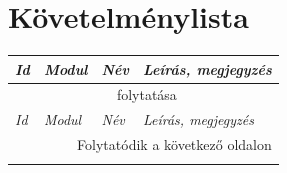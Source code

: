 \documentclass[]{thesis-ekf}
\theoremstyle{definition}
\theoremstyle{remark}
\begin{document}
		\section*{Követelménylista}\label{kovetelmenylista}
			\begin{longtable}{|l|l|p{3cm}|p{8cm}|}
				\hline
				\emph{Id} & \emph{Modul} & \emph{Név} & \emph{Leírás, megjegyzés} \\ \hline
				\endfirsthead
				
				\multicolumn{4}{c}{{\tablename\ folytatása}} \\
				\hline
				\emph{Id} & \emph{Modul} & \emph{Név} & \emph{Leírás, megjegyzés} \\ \hline
				\endhead
				
				\hline \multicolumn{4}{r}{{Folytatódik a következő oldalon}} \\
				\endfoot
				
				\hline
				\endlastfoot
				

\end{longtable}
\end{document}
